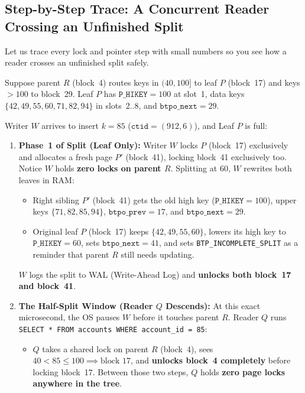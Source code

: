 \subsection{Step-by-Step Trace: A Concurrent Reader Crossing an Unfinished Split}

Let us trace every lock and pointer step with small numbers so you see how a reader crosses an unfinished split safely.

Suppose parent $R$ (block~4) routes keys in $(40, 100]$ to leaf $P$ (block~17) and keys $> 100$ to block~29. Leaf $P$ has $\texttt{P\_HIKEY} = 100$ at slot~1, data keys $\{42, 49, 55, 60, 71, 82, 94\}$ in slots~2..8, and $\texttt{btpo\_next} = 29$.

Writer $W$ arrives to insert $k = 85$ ($\texttt{ctid} = (912, 6)$), and Leaf $P$ is full:

\begin{enumerate}
  \item \textbf{Phase~1 of Split (Leaf Only):} Writer $W$ locks $P$ (block~17) exclusively and allocates a fresh page $P'$ (block~41), locking block~41 exclusively too. Notice $W$ holds \textbf{zero locks on parent $R$}. Splitting at $60$, $W$ rewrites both leaves in RAM:
  \begin{itemize}
    \item Right sibling $P'$ (block~41) gets the old high key ($\texttt{P\_HIKEY} = 100$), upper keys $\{71, 82, 85, 94\}$, $\texttt{btpo\_prev} = 17$, and $\texttt{btpo\_next} = 29$.
    \item Original leaf $P$ (block~17) keeps $\{42, 49, 55, 60\}$, lowers its high key to $\texttt{P\_HIKEY} = 60$, sets $\texttt{btpo\_next} = 41$, and sets \texttt{BTP\_INCOMPLETE\_SPLIT} as a reminder that parent $R$ still needs updating.
  \end{itemize}
  $W$ logs the split to WAL (Write-Ahead Log) and \textbf{unlocks both block~17 and block~41}.

  \item \textbf{The Half-Split Window (Reader $Q$ Descends):} At this exact microsecond, the OS pauses $W$ before it touches parent $R$. Reader $Q$ runs \texttt{SELECT * FROM accounts WHERE account\_id = 85}:
  \begin{itemize}
    \item $Q$ takes a shared lock on parent $R$ (block~4), sees $40 < 85 \le 100 \implies \text{block } 17$, and \textbf{unlocks block~4 completely} before locking block~17. Between those two steps, $Q$ holds \textbf{zero page locks anywhere in the tree}.
  \end{itemize}


\end{enumerate}
